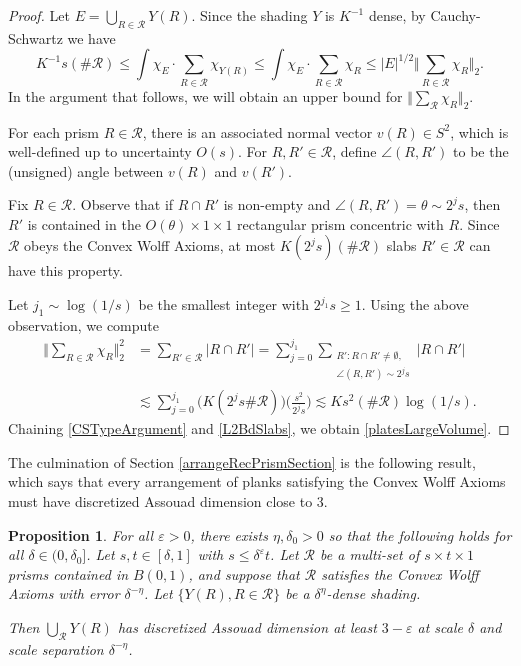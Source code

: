 \documentclass[letterpaper, reqno,11pt]{article}
\numberwithin{equation}{section}
\newcommand{\eps}{\varepsilon}
\numberwithin{thm}{section}
\newtheorem{prop}[thm]{Proposition}
\theoremstyle{remark}
\begin{document}
\begin{proof}
Let $E=\bigcup_{R\in\mathcal{R}}Y(R)$. Since the shading $Y$ is $K^{-1}$ dense, by Cauchy-Schwartz we have
\begin{equation}\label{CSTypeArgument}
K^{-1}s(\#\mathcal{R})\leq \int \chi_E \cdot \sum_{R\in\mathcal{R}}\chi_{Y(R)}\leq \int \chi_E \cdot \sum_{R\in\mathcal{R}}\chi_{R} \leq |E|^{1/2} \Big\Vert \sum_{R\in\mathcal{R}}\chi_R\Big\Vert_2.
\end{equation}
In the argument that follows, we will obtain an upper bound for $\big\Vert \sum_{\mathcal{R}}\chi_R\big\Vert_2$. 

For each prism $R\in\mathcal{R}$, there is an associated normal vector $v(R)\in S^2$, which is well-defined up to uncertainty $O(s)$. For $R,R'\in\mathcal{R}$, define $\angle(R,R')$ to be the (unsigned) angle between $v(R)$ and $v(R')$. 

 Fix $R\in\mathcal{R}$. Observe that if $R\cap R'$ is non-empty and $\angle(R,R')=\theta\sim 2^j s$, then $R'$ is contained in the $O(\theta)\times 1\times 1$ rectangular prism concentric with $R$. Since $\mathcal{R}$ obeys the Convex Wolff Axioms, at most $K(2^j s)(\#\mathcal{R})$ slabs $R'\in\mathcal{R}$ can have this property.


Let $j_1\sim\log(1/ s)$ be the smallest integer with $2^{j_1} s\geq 1$. Using the above observation, we compute
\begin{equation}\label{L2BdSlabs}
\begin{split}
\Big\Vert \sum_{R\in\mathcal{R}}\chi_R\Big\Vert_2^2  & = \sum_{R'\in\mathcal{R}}|R\cap R'| = \sum_{j=0}^{j_1}\sum_{\substack{R'\colon R\cap R'\neq\emptyset,\\ \angle(R,R')\sim 2^j s}}|R\cap R'|\\
& \lesssim \sum_{j=0}^{j_1}\Big(K (2^j s\#\mathcal{R}) \Big)\Big(\frac{s^2}{2^j s}\Big)\lesssim K s^2(\#\mathcal{R})\log(1/s).
\end{split}
\end{equation}
%
Chaining \eqref{CSTypeArgument} and \eqref{L2BdSlabs}, we obtain \eqref{platesLargeVolume}.
%
\end{proof}


The culmination of Section \ref{arrangeRecPrismSection} is the following result, which says that every arrangement of planks satisfying the Convex Wolff Axioms must have discretized Assouad dimension close to 3. 


\begin{prop}\label{planksBigVolSomeScale}
For all $\eps>0$, there exists $\eta,\delta_0>0$ so that the following holds for all $\delta\in(0,\delta_0]$. Let $s,t\in [\delta,1]$ with $s\leq\delta^{\eps}t$. Let $\mathcal{R}$ be a multi-set of $s\times t\times 1$ prisms contained in $B(0,1)$, and suppose that $\mathcal{R}$ satisfies the Convex Wolff Axioms with error $\delta^{-\eta}$. Let $\{Y(R), R\in\mathcal{R}\}$ be a $\delta^{\eta}$-dense shading. 

\noindent Then $\bigcup_{\mathcal{R}}Y(R)$ has discretized Assouad dimension at least $3-\eps$ at scale $\delta$ and scale separation $\delta^{-\eta}$.
\end{prop}
\end{document}
